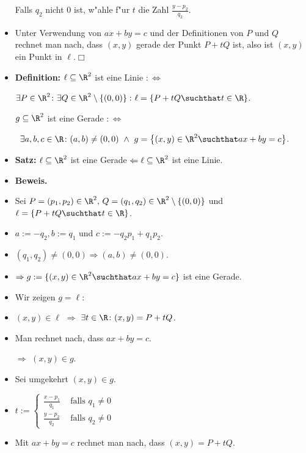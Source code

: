 \documentclass[a4paper%
]{report}
\begin{document}
\begin{itemize}[\mbox{}]
  Falls $q_2$ nicht $0$ ist, w"ahle f"ur $t$ die Zahl $\displaystyle
  \frac{y-p_2}{q_2}$.
\item Unter Verwendung von $ax+by=c$ und der Definitionen von $P$ und
  $Q$ rechnet man nach, dass $(x,y)$ gerade der Punkt $P +tQ$ ist,
  also ist $(x,y)$ ein Punkt in $\ell$.\hfill$\Box$
\end{itemize}


\newpage

\begin{itemize}[\mbox{}]
\item {\bfseries Definition:} $\ell\subseteq\R^2$ ist eine Linie
  $:\Leftrightarrow$

  $\exists P\in\R^2 \colon \exists
  Q\in\R^2\setminus\left\{(0,0)\right\} \colon \ell=\left\{P+t Q
    \suchthat t \in \R \right\}$.
  \bigskip
  
  $g\subseteq\R^2$ ist eine Gerade $:\Leftrightarrow$

  \mbox{%
    $\exists a,b,c\in\R\colon (a,b)\neq (0,0) \ \wedge \ 
    g=\left\{(x,y) \in \R^2 \suchthat ax+by=c\right\}$.
  }
\item {\bfseries Satz:} $\ell \subseteq \R^2$ ist eine Gerade $\Leftarrow
  \ell \subseteq \R^2$ ist eine Linie.
\item {\bfseries Beweis.}
\item Sei $P=(p_{1},p_{2})\in\R^2,\,
  Q=(q_{1},q_{2})\in\R^2\setminus\left\{(0,0)\right\}$ und
  $\ell=\left\{P+t Q \suchthat t \in \R \right\}$.
\item $a:=-q_{2}, b:=q_{1}$ und $c:=-q_{2}p_{1}+q_{1}p_{2}$.
\item $(q_{1},q_{2})\neq (0,0)\Rightarrow (a,b)\neq (0,0)$.
\item $\Rightarrow g:=\{(x,y)\in\R^2\suchthat ax+by=c\}$ ist eine
  Gerade.
\item Wir zeigen $g=\ell$:
\item $(x,y) \in \ell$ $\Rightarrow$ $\exists t \in \R \colon (x,y) =
  P+tQ$.
\item Man rechnet nach, dass $ax+by=c$.

  $\Rightarrow$ $(x,y) \in g$.
\item Sei umgekehrt $(x,y) \in g$.
\item %
  $\displaystyle t :=
  \begin{cases}
    \frac{x-p_1}{q_1} & \text{ falls } q_1 \neq 0 \\
    \frac{y-p_2}{q_2} & \text{ falls } q_2 \neq 0
  \end{cases}$
\item Mit $ax+by=c$ rechnet man nach, dass $(x,y) = P +tQ$.


\end{itemize}
\end{document}
